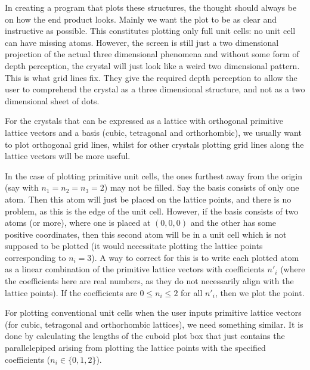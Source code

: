 \documentclass[main.tex]{subfiles}
\begin{document}
	In creating a program that plots these structures, the thought should always be on how the end product looks. Mainly we want the plot to be as clear and instructive as possible. This constitutes plotting only full unit cells: no unit cell can have missing atoms. However, the screen is still just a two dimensional projection of the actual three dimensional phenomena and without some form of depth perception, the crystal will just look like a weird two dimensional pattern. This is what grid lines fix. They give the required depth perception to allow the user to comprehend the crystal as a three dimensional structure, and not as a two dimensional sheet of dots. 
	
	For the crystals that can be expressed as a lattice with orthogonal primitive lattice vectors and a basis (cubic, tetragonal and orthorhombic), we usually want to plot orthogonal grid lines, whilst for other crystals plotting grid lines along the lattice vectors will be more useful.
	
	In the case of plotting primitive unit cells, the ones furthest away from the origin (say with $ n_1 = n_2 = n_3 = 2 $) may not be filled. Say the basis consists of only one atom. Then this atom will just be placed on the lattice points, and there is no problem, as this is the edge of the unit cell. However, if the basis consists of two atoms (or more), where one is placed at $ (0,0,0) $ and the other has some positive coordinates, then this second atom will be in a unit cell which is not supposed to be plotted (it would necessitate plotting the lattice points corresponding to $ n_i = 3 $). A way to correct for this is to write each plotted atom as a linear combination of the primitive lattice vectors with coefficients $ n'_i $ (where the coefficients here are real numbers, as they do not necessarily align with the lattice points). If the coefficients are $ 0 \leq n_i \leq 2 $ for all $ n'_i $, then we plot the point.
	
	For plotting conventional unit cells when the user inputs primitive lattice vectors (for cubic, tetragonal and orthorhombic lattices), we need something similar. It is done by calculating the lengths of the cuboid plot box that just contains the parallelepiped arising from plotting the lattice points with the specified coefficients ($ n_i \in \{0, 1, 2\}$).
	
\end{document}
